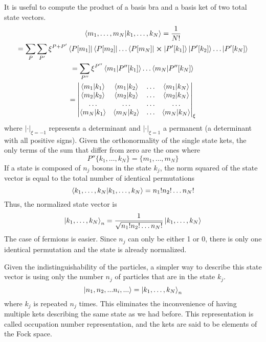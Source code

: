It is useful to compute the product of a basis bra and a basis ket of two total state vectors.
\begin{multline} \label{eq:basis_product}
    \bra{m_1, \dots, m_N} \ket{k_1, \dots, k_N} = \frac{1}{N!}
    \\ = \sum_P \sum_{P'} \xi^{P+P'} \bra{P[m_1]}\bra{P[m_2]}\dots\bra{P[m_N]} \cross \ket{P'[k_1]}\ket{P'[k_2]}\dots\ket{P'[k_N]}
    \\ = \sum_{P''} \xi^{P''} \braket{m_1}{P''[k_1]} \dots \braket{m_N}{P''[k_N]}
    \\ = \begin{vmatrix}
        \braket{m_1}{k_1} & \braket{m_1}{k_2} & \dots & \braket{m_1}{k_N} \\
        \braket{m_2}{k_2} & \braket{m_2}{k_2} & \dots & \braket{m_2}{k_N} \\
        \dots             & \dots             & \dots & \dots             \\
        \braket{m_N}{k_1} & \braket{m_N}{k_2} & \dots & \braket{m_N}{k_N}
    \end{vmatrix}_\xi
\end{multline}
where $|\cdot|_{\xi = -1}$ represents a determinant and $|\cdot|_{\xi = 1}$ a permanent (a determinant with all positive signs). Given the orthonormality of the single state kets, the only terms of the sum that differ from zero are the ones where
\begin{equation}
    P''\{k_1, \dots, k_N\} = \{m_1, \dots, m_N\}
\end{equation}
If a state is composed of $n_j$ bosons in the state $k_j$, the norm squared of the state vector is equal to the total number of identical permutations
\begin{equation}
    \braket{k_1, \dots, k_N} = n_1!n_2!\dots n_N!
\end{equation}
Thus, the normalized state vector is
\begin{equation}
    \ket{k_1, \dots, k_N}_n= \frac{1}{\sqrt{n_1!n_2!\dots n_N!}} \ket{k_1, \dots, k_N}
\end{equation}
The case of fermions is easier. Since $n_j$ can only be either 1 or 0, there is only one identical permutation and the state is already normalized.

Given the indistinguishability of the particles, a simpler way to describe this state vector is using only the number $n_j$ of particles that are in the state $k_j$.
\begin{equation} \label{eq:occupation_definition}
    \ket{n_1, n_2, ... n_i, ...} = \ket{k_1, \dots, k_N}_n
\end{equation}
where $k_j$ is repeated $n_j$ times. This eliminates the inconvenience of having multiple kets describing the same state as we had before. This representation is called occupation number representation, and the kets are said to be elements of the Fock space.

